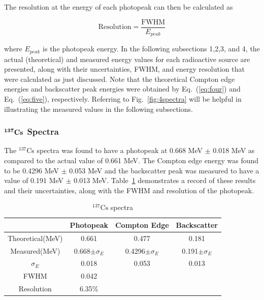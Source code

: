 \documentclass[%
 aip,
rsi,%
 amsmath,amssymb,
 reprint,%
author-numerical,%
]{revtex4-1}
\begin{document}
The resolution at the energy of each photopeak can then be calculated as 

\begin{equation}
\text{Resolution}=\frac{\text{FWHM}}{E_{peak}}
 \label{eq:eleven}
\end{equation}

where $E_{peak}$ is the photopeak energy. \newline
\indent In the following subsections 1,2,3, and 4, the actual (theoretical) and measured energy values for each radioactive source are presented, along with their uncertainties, FWHM, and energy resolution that were calculated as just discussed. Note that the theoretical Compton edge energies and backscatter peak energies were obtained by Eq.~(\ref{eq:four}) and Eq.~(\ref{eq:five}), respectively. Referring to Fig.~\ref{fig:4spectra} will be helpful in illustrating the measured values in the following subsections.



\subsubsection{$\bf{ ^ { 137 }Cs }$ Spectra }
The $^ { 137 }$Cs  spectra was found to have a photopeak at 0.668 MeV $\pm$ 0.018 MeV as compared to the actual value of 0.661 MeV. The Compton edge energy was found to be 0.4296 MeV $\pm$ 0.053 MeV and the backscatter peak was measured to have a value of 0.191 MeV $\pm$ 0.013 MeV. Table~\ref{tab:table1} demonstrates a record of these results and their uncertainties, along with the FWHM and resolution of the photopeak.

\begin{table}[H]
\caption{\label{tab:table1}$\mathrm {  ^ { 137 }Cs }$ spectra }
\begin{ruledtabular}
\begin{tabular}{cccc}
&Photopeak&Compton Edge&Backscatter\\
\hline
Theoretical(MeV)&0.661&0.477 &0.181 \\
\hline
Measured(MeV)&0.668$\pm\sigma_E$&0.4296$\pm\sigma_E$&0.191$\pm\sigma_E$\\
\hline
$\sigma_E$ &0.018 & 0.053 & 0.013\\
\hline
FWHM &0.042 &  & \\
\hline
Resolution &6.35$\%$ &  & \\
\end{tabular}
\end{ruledtabular}
\end{table}
\end{document}

